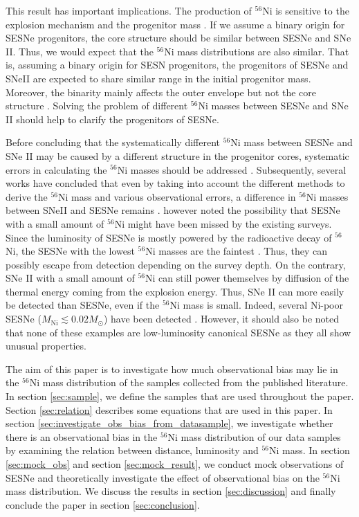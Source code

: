 \documentclass[twocolumn, linenumbers]{aastex62}
\begin{document}
This result has important implications. The production of $^{56}$Ni is sensitive to the explosion mechanism \citep{2009MNRAS.394.1317M, 2015MNRAS.451..282S, 2019ApJ...886...47S} and the progenitor mass \citep{2019MNRAS.483.3607S}.
If we assume a binary origin for SESNe progenitors, the core structure should be similar between SESNe and SNe II. Thus, we would expect that the $^{56}$Ni mass distributions are also similar. 
That is, assuming a binary origin for SESN progenitors, the progenitors of SESNe and SNeII are expected to share similar range in the initial progenitor mass. Moreover, the binarity mainly affects the outer envelope but not the core structure \citep{2010ApJ...725..940Y, 2017ApJ...840...10Y, 2017ApJ...840...90O}. Solving the problem of different $^{56}$Ni masses between SESNe and SNe II should help to clarify the progenitors of SESNe.

Before concluding that the systematically different $^{56}$Ni mass between SESNe and SNe II may be caused by a different structure in the progenitor cores, systematic errors in calculating the $^{56}$Ni masses should be addressed \citep{2019A&A...628A...7A}. Subsequently, several works have concluded that even by taking into account the different methods to derive the $^{56}$Ni mass and various observational errors, a difference in $^{56}$Ni masses between SNeII and SESNe remains
\citep{2020A&A...641A.177M, 2020arXiv200906683A}.
\citet{2020A&A...641A.177M} however noted the possibility that SESNe with a small amount of $^{56}$Ni might have been missed by the existing surveys. Since the luminosity of SESNe is mostly powered by the radioactive decay of $^{56}$Ni, the SESNe with the lowest $^{56}$Ni masses are the faintest \citep{2016MNRAS.457..328L}. Thus, they can possibly escape from detection depending on the survey depth. On the contrary, SNe II with a small amount of $^{56}$Ni can still power themselves by diffusion of the thermal energy coming from the explosion energy. Thus, SNe II can more easily be detected than SESNe, even if the $^{56}$Ni mass is small. Indeed, several Ni-poor SESNe ($M_{\mathrm{Ni}} \lesssim 0.02 M_{\odot}$) have been detected \citep{2010ApJ...723L..98K, 2016MNRAS.461.3057S, 2019ApJ...875...76N}. However, it should also be noted that none of these examples are low-luminosity canonical SESNe as they all show unusual properties.

The aim of this paper is to investigate how much observational bias may lie in the $^{56}$Ni mass distribution of the samples collected from the published literature. In section \ref{sec:sample}, we define the samples that are used throughout the paper. Section \ref{sec:relation} describes some equations that are used in this paper. In section \ref{sec:investigate_obs_bias_from_datasample}, we investigate whether there is an observational bias in the $^{56}$Ni mass distribution of our data samples by examining the relation between distance, luminosity and $^{56}$Ni mass. In section \ref{sec:mock_obs} and section \ref{sec:mock_result}, we conduct mock observations of SESNe and theoretically investigate the effect of observational bias on the $^{56}$Ni mass distribution. We discuss the results in section \ref{sec:discussion} and finally conclude the paper in section \ref{sec:conclusion}.
\end{document}
